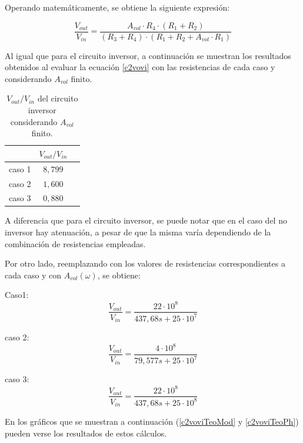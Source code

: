 Operando matem\'aticamente, se obtiene la siguiente expresi\'on:

\begin{equation}
	\frac{V_{out}}{V_{in}} =  \frac{A_{vol} \cdot R_4 \cdot (R_1 + R_2)}{(R_3 + R_4) \cdot (R_1 + R_2 + A_{vol} \cdot R_1)}
	\label{c2vovi}
\end{equation}

Al igual que para el circuito inversor, a continuaci\'on se muestran
los resultados obtenidos al evaluar la ecuaci\'on \ref{c2vovi} con las resistencias
de cada caso y considerando $A_{vol}$ finito.

\begin{table}[h!]
	\centering
	\begin{tabular}{c c c}%
		\bfseries  & $V_{out}/V_{in}$  \\ \hline
		caso 1 & $8,799$ \\
		caso 2 & $1,600$ \\
		caso 3 & $0,880$ \\
		\hline
	\end{tabular}
	\caption{$V_{out}/V_{in}$ del circuito inversor considerando $A_{vol}$ finito.}
	\label{avolf2}
\end{table}

A diferencia que para el circuito inversor, se puede notar que
en el caso del no inversor hay atenuaci\'on, a pesar de que la misma
var\'ia dependiendo de la combinaci\'on de resistencias empleadas.

Por otro lado, reemplazando con los valores de resistencias correspondientes
 a cada caso y con $A_{vol}(\omega)$, se obtiene:

Caso1:
\begin{equation}
	\frac{V_{out}}{V_{in}} = \frac{22 \cdot 10^8}{437,68 s + 25 \cdot 10^7}
	\label{c2c1vovi}
\end{equation}

caso 2:
\begin{equation}
	\frac{V_{out}}{V_{in}} = \frac{4 \cdot 10^8}{79,577 s + 25 \cdot 10^7}
	\label{c2c2vovi}
\end{equation}

caso 3:
\begin{equation}
	\frac{V_{out}}{V_{in}} = \frac{22 \cdot 10^8}{437,68 s + 25 \cdot 10^8}
	\label{c2c3vovi}
\end{equation}

En los gr\'aficos que se muestran a continuaci\'on (\ref{c2voviTeoMod} y \ref{c2voviTeoPh}) pueden verse los resultados de estos c\'alculos.

